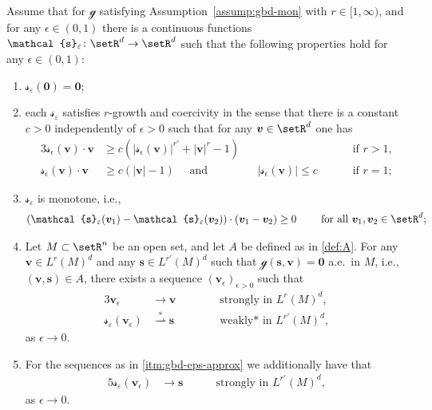 \documentclass[reqno,a4paper]{amsart}
\def\abs#1{\left| #1 \right|}
\def\vec#1{\boldsymbol{#1}}
\def\wsconv{\overset{*}{\rightharpoonup}}
\def\b0{\vec{0}}
\def\bs{\vec{s}}
\def\bv{\vec{v}}
\def\gbd{\vec{\mathcal{g}}}
\def\Srel{\vec{\mathcal{s}}}
\def\Seps{\Srel_{\varepsilon}}
\begin{document}
	\begin{assumption}[regularisation]
		\label{assump:gbd-reg}
		Assume that for $\gbd$ satisfying Assumption~\ref{assump:gbd-mon} with $r \in [1,\infty)$, and for any $\epsilon \in (0,1)$ there is a  continuous functions $\Seps\colon \setR^d \to \setR^d$ such that the following properties hold for any $\epsilon \in (0,1)$: 
		\begin{enumerate}[label = (a\arabic*)]
			\item \label{itm:gbd-eps-0}
			$\Seps(\b0) = \b0$;
			\item \label{itm:gbd-eps-q} each $\Seps$ satisfies $r$-growth and coercivity in the sense that there is a constant $c>0$ independently of $\epsilon>0$ such that for any $\bv \in \setR^d$ one has
			\begin{alignat*}{3}
				\Srel_{\epsilon}(\bv)  \cdot \bv &\geq c (\abs{	\Srel_{\epsilon}(\bv) }^{r'} + \abs{\bv}^r - 1)&& \qquad \qquad &\text{ if } r >1, \\
				\Srel_{\epsilon}(\bv)  \cdot \bv &\geq c ( \abs{\bv} - 1) \quad   \text{ and }\;\; & &\abs{\Srel_{\epsilon}(\bv) } \leq c \qquad 
				&\text{ if } r = 1;
			\end{alignat*}
			\item \label{itm:gbd-eps-mon}
			$\Seps$ is monotone, i.e., 
			\begin{align*}
				(\Seps(\bv_1) - \Seps(\bv_2)) \cdot (\bv_1 - \bv_2) \geq 0 \qquad \text{ for all } \bv_1, \bv_2 \in \setR^d;
			\end{align*} 
			\item \label{itm:gbd-eps-approx} Let $M \subset \setR^n$ be an open set, and let $A$ be defined as in \eqref{def:A}. 
			For any~$\bv \in L^{r}(M)^d$ and any $\bs\in L^{r'}(M)^d$ such that $\gbd(\bs,\bv) = \b0$  a.e.~in $M$, i.e., 
			$(\bv,\bs) \in A$, there exists a sequence $(\bv_{\epsilon})_{\epsilon>0}$ such that 
			\begin{alignat*}{3}
				\bv_{\epsilon} &\to \bv \qquad &&\text{ strongly in } L^{r}(M)^d,\\
				\Seps(\bv_{\epsilon}) &\wsconv \bs \quad &&\text{ weakly*  in }  L^{r'}(M)^d,
			\end{alignat*}
			as $\epsilon \to 0$. 
			\item \label{itm:gbd-eps-approx-var} 
			For the sequences as in \ref{itm:gbd-eps-approx} we additionally have that 		
			\begin{alignat*}{5}
				\Seps(\bv_{\epsilon}) &\to  \bs \quad &&\text{ strongly  in }  L^{r'}(M)^d,
			\end{alignat*}
			as $\epsilon \to 0$. 
		\end{enumerate} 
	\end{assumption}
	
\end{document}
